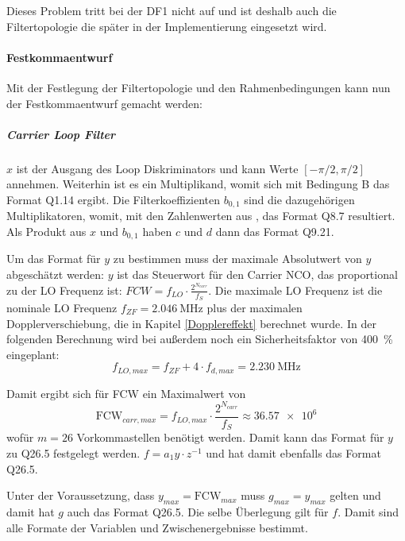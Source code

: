 Dieses Problem tritt bei der DF1 nicht auf und ist deshalb auch die Filtertopologie die später in der Implementierung eingesetzt wird.


\paragraph{Festkommaentwurf}
Mit der Festlegung der Filtertopologie und den Rahmenbedingungen kann nun der Festkommaentwurf gemacht werden: 

\subparagraph{Carrier Loop Filter}
$x$ ist der Ausgang des Loop Diskriminators und kann Werte $[-\pi/2, \pi/2]$ annehmen. Weiterhin ist es ein Multiplikand, womit sich mit Bedingung B das Format Q1.14 ergibt. Die Filterkoeffizienten $b_{0,1}$ sind die dazugehörigen Multiplikatoren, womit, mit den Zahlenwerten aus , das Format Q8.7 resultiert. Als Produkt aus $x$ und $b_{0,1}$ haben $c$ und $d$ dann das Format Q9.21. 

Um das Format für $y$ zu bestimmen muss der maximale Absolutwert von $y$ abgeschätzt werden: $y$ ist das Steuerwort \gpsfcw für den Carrier NCO, das proportional zu der LO Frequenz ist: $FCW=f_{LO} \cdot \frac{2^{N_{carr}}}{f_S}$. Die maximale LO Frequenz ist die nominale LO Frequenz $f_{ZF}=\SI{2.046}{\MHz}$ plus der maximalen Dopplerverschiebung, die in Kapitel \ref{Dopplereffekt} berechnet wurde. In der folgenden Berechnung wird bei außerdem noch ein Sicherheitsfaktor von \SI{400}{\percent} eingeplant: 
\begin{equation}
    f_{LO,max} = f_{ZF} + 4 \cdot f_{d,max} = \SI{2.230}{\MHz}
\end{equation}

Damit ergibt sich für FCW ein Maximalwert von 
\begin{equation}
    \textrm{FCW}_{carr,max} = f_{LO,max} \cdot \frac{2^{N_{carr}}}{f_S} \approx \num{36.57e6}
\end{equation}
wofür $m=26$ Vorkommastellen benötigt werden. Damit kann das Format für $y$ zu Q26.5  festgelegt werden. $f=a_1 y\cdot z^{-1} $ und hat damit ebenfalls das Format Q26.5.

Unter der Voraussetzung, dass $y_{max}=\textrm{FCW}_{max}$ muss $g_{max}=y_{max}$ gelten und damit hat $g$ auch das Format Q26.5. Die selbe Überlegung gilt für $f$. Damit sind alle Formate der Variablen und Zwischenergebnisse bestimmt.

